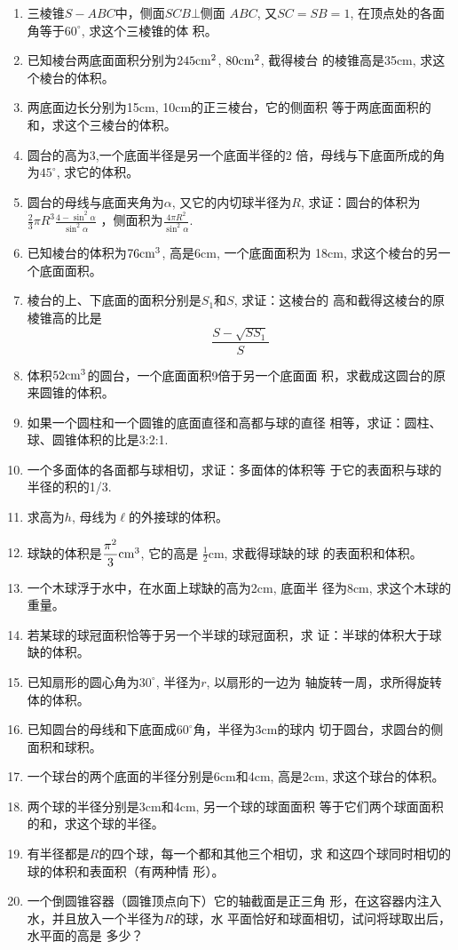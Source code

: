\begin{enumerate}
\item 三棱锥$S-ABC$中，侧面$SCB\bot$侧面 $ABC$, 又$SC=SB
=1$, 在顶点处的各面角等于$60^{\circ}$, 求这个三棱锥的体
积。
\item 已知棱台两底面面积分别为$245{\rm cm^2}$, $80{\rm cm^2}$, 截得棱台
的棱锥高是35cm, 求这个棱台的体积。
\item 两底面边长分别为15cm, 10cm的正三棱台，它的侧面积
等于两底面面积的和，求这个三棱台的体积。
\item 圆台的高为3,一个底面半径是另一个底面半径的2
倍，母线与下底面所成的角为$45^{\circ}$, 求它的体积。
\item 圆台的母线与底面夹角为$\alpha$, 又它的内切球半径为$R$, 
求证：圆台的体积为$\frac{2}{3}\pi R^3\frac{4-\sin^2\alpha}{\sin^2\alpha}$
，侧面积为$\frac{4\pi R^2}{\sin^2\alpha}$.
\item 已知棱台的体积为$76{\rm cm^3}$, 高是6cm, 一个底面面积为
18cm, 求这个棱台的另一个底面面积。
\item 棱台的上、下底面的面积分别是$S_1$和$S$, 求证：这棱台的
高和截得这棱台的原棱锥高的比是
\[\frac{S-\sqrt{SS_1}}{S}\]
\item 体积$52{\rm cm^3}$的圆台，一个底面面积9倍于另一个底面面
积，求截成这圆台的原来圆锥的体积。
\item 如果一个圆柱和一个圆锥的底面直径和高都与球的直径
相等，求证：圆柱、球、圆锥体积的比是3:2:1.
\item 一个多面体的各面都与球相切，求证：多面体的体积等
于它的表面积与球的半径的积的1/3.
\item 求高为$h$, 母线为$\ell$的外接球的体积。
\item 球缺的体积是$\frac{\pi^2}{3}{\rm cm^3}$, 它的高是
$\frac{1}{2}$cm, 求截得球缺的球
的表面积和体积。
\item 一个木球浮于水中，在水面上球缺的高为2cm, 底面半
径为8cm, 求这个木球的重量。
\item 若某球的球冠面积恰等于另一个半球的球冠面积，求
证：半球的体积大于球缺的体积。
\item 已知扇形的圆心角为$30^{\circ}$, 半径为$r$, 以扇形的一边为
轴旋转一周，求所得旋转体的体积。
\item 已知圆台的母线和下底面成$60^{\circ}$角，半径为3cm的球内
切于圆台，求圆台的侧面积和球积。
\item 一个球台的两个底面的半径分别是6cm和4cm, 高是2cm, 
求这个球台的体积。
\item 两个球的半径分别是3cm和4cm, 另一个球的球面面积
等于它们两个球面面积的和，求这个球的半径。
\item 有半径都是$R$的四个球，每一个都和其他三个相切，求
和这四个球同时相切的球的体积和表面积（有两种情
形）。
\item 一个倒圆锥容器（圆锥顶点向下）它的轴截面是正三角
形，在这容器内注入水，并且放入一个半径为$R$的球，水
平面恰好和球面相切，试问将球取出后，水平面的高是
多少？
\end{enumerate}


